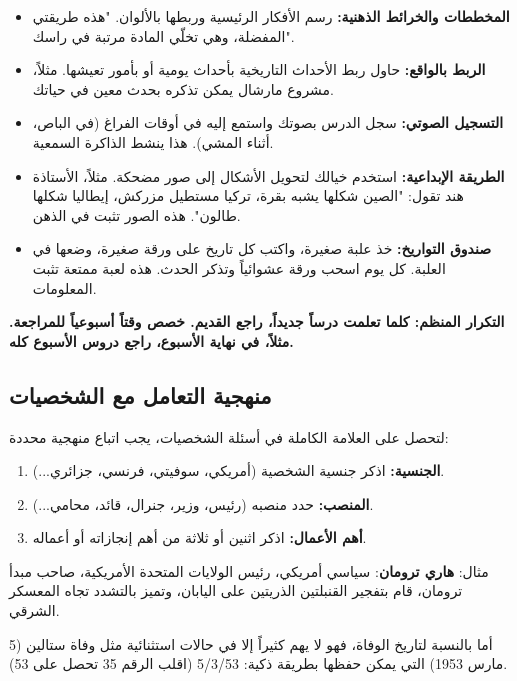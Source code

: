 \documentclass[12pt,a4paper]{book}
\newcommand{\importantAr}[1]{%
	\begin{important}
		\bfseries #1
	\end{important}
}
\begin{document}
	\begin{itemize}
		\item \textbf{المخططات والخرائط الذهنية:} رسم الأفكار الرئيسية وربطها بالألوان. "هذه طريقتي المفضلة، وهي تخلّي المادة مرتبة في راسك".
		\item \textbf{الربط بالواقع:} حاول ربط الأحداث التاريخية بأحداث يومية أو بأمور تعيشها. مثلاً، مشروع مارشال يمكن تذكره بحدث معين في حياتك.
		\item \textbf{التسجيل الصوتي:} سجل الدرس بصوتك واستمع إليه في أوقات الفراغ (في الباص، أثناء المشي). هذا ينشط الذاكرة السمعية.
		\item \textbf{الطريقة الإبداعية:} استخدم خيالك لتحويل الأشكال إلى صور مضحكة. مثلاً، الأستاذة هند تقول: "الصين شكلها يشبه بقرة، تركيا مستطيل مزركش، إيطاليا شكلها طالون". هذه الصور تثبت في الذهن.
		\item \textbf{صندوق التواريخ:} خذ علبة صغيرة، واكتب كل تاريخ على ورقة صغيرة، وضعها في العلبة. كل يوم اسحب ورقة عشوائياً وتذكر الحدث. هذه لعبة ممتعة تثبت المعلومات.
	\end{itemize}
	
	\importantAr{التكرار المنظم: كلما تعلمت درساً جديداً، راجع القديم. خصص وقتاً أسبوعياً للمراجعة. مثلاً، في نهاية الأسبوع، راجع دروس الأسبوع كله.}
	
	\subsection{منهجية التعامل مع الشخصيات}
	
	لتحصل على العلامة الكاملة في أسئلة الشخصيات، يجب اتباع منهجية محددة:
	
	\begin{enumerate}
		\item \textbf{الجنسية:} اذكر جنسية الشخصية (أمريكي، سوفيتي، فرنسي، جزائري...).
		\item \textbf{المنصب:} حدد منصبه (رئيس، وزير، جنرال، قائد، محامي...).
		\item \textbf{أهم الأعمال:} اذكر اثنين أو ثلاثة من أهم إنجازاته أو أعماله.
	\end{enumerate}
	
	مثال: \textbf{هاري ترومان}: سياسي أمريكي، رئيس الولايات المتحدة الأمريكية، صاحب مبدأ ترومان، قام بتفجير القنبلتين الذريتين على اليابان، وتميز بالتشدد تجاه المعسكر الشرقي.
	
	أما بالنسبة لتاريخ الوفاة، فهو لا يهم كثيراً إلا في حالات استثنائية مثل وفاة ستالين (5 مارس 1953) التي يمكن حفظها بطريقة ذكية: 5/3/53 (اقلب الرقم 35 تحصل على 53).
	
\end{document}
